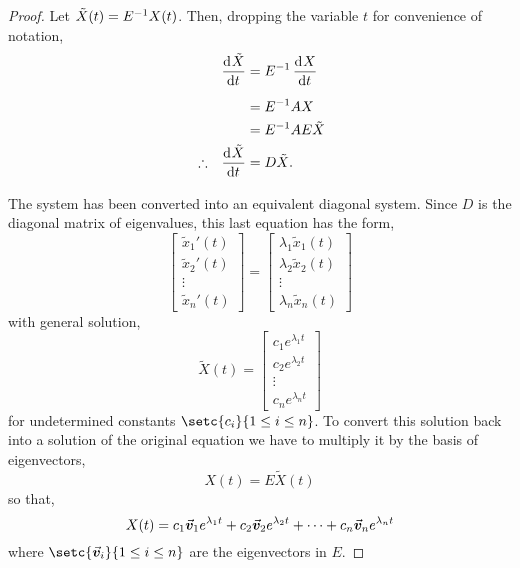 \documentclass[../MathsNotesBase.tex]{subfiles}
\begin{document}
{		\begin{tcolorbox}[breakable,enhanced jigsaw,colframe=white,colback=white,boxrule=0pt,arc=0pt,left=0pt,right=0pt,top=0pt,bottom=0pt]
			\begin{proof}
				\renewcommand\t[1]{\tilde{#1}}
				Let ${ \t{X}(t) = \inv{E} X(t) }$. Then, dropping the variable $t$ for convenience of notation,
				\[\begin{aligned}
					&& \dod{\t{X}}{t} &= \inv{E} \dod{X}{t}\nn
					&& &= \inv{E} AX \\
					&& &= \inv{E} A E \t{X} \\
					&\therefore & \dod{\t{X}}{t} &= D \t{X}. \nn
				\end{aligned}\]
				The system has been converted into an equivalent diagonal system. Since $D$ is the diagonal matrix of eigenvalues, this last equation has the form,
				\[ \begin{bmatrix}
						\t{x}_1'(t)\\ \t{x}_2'(t)\\ \vdots\\ \t{x}_n'(t)
				   \end{bmatrix} =
			   	   \begin{bmatrix}
			   	   		\lambda_1 \t{x}_1(t) \\ \lambda_2 \t{x}_2(t) \\ \vdots \\ \lambda_n \t{x}_n(t)
			   	   \end{bmatrix}
				\]
				with general solution,
				\[ \t{X}(t) = \begin{bmatrix}
				   		c_1 e^{\lambda_1 t}\\ c_2 e^{\lambda_2 t}\\ \vdots\\ c_n e^{\lambda_n t}
				   \end{bmatrix}
				\]
				for undetermined constants ${ \setc{c_i}{1 \leq i \leq n} }$. To convert this solution back into a solution of the original equation we have to multiply it by the basis of eigenvectors,
				\[ X(t) = E \t{X}(t) \]
				so that,
				\[ X(t) = c_1 \vec{\bm{v}}_1 e^{\lambda_1 t} + c_2 \vec{\bm{v}}_2 e^{\lambda_2 t} + \cdots + c_n \vec{\bm{v}}_n e^{\lambda_n t} \]
				where ${ \setc{\v_i}{1 \leq i \leq n} }$ are the eigenvectors in $E$.
			\end{proof}
		\end{tcolorbox}
		
}
\end{document}
